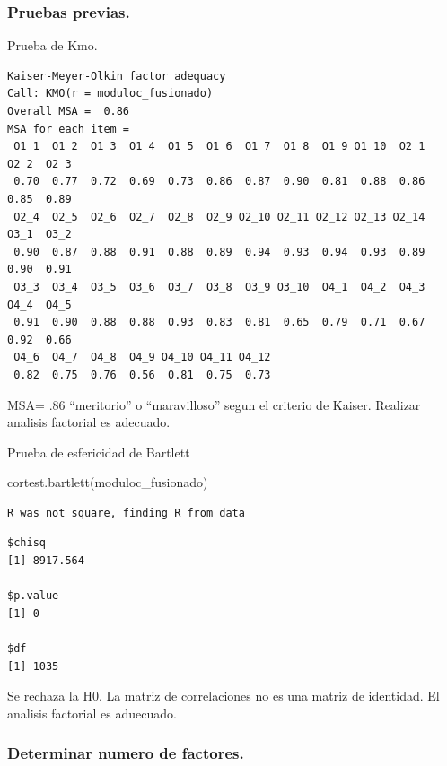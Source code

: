 \documentclass[
  letterpaper,
  DIV=11,
  numbers=noendperiod]{scrartcl}
\newenvironment{Shaded}{\begin{snugshade}}{\end{snugshade}}
\newcommand{\FunctionTok}[1]{\textcolor[rgb]{0.28,0.35,0.67}{#1}}
\newcommand{\NormalTok}[1]{\textcolor[rgb]{0.00,0.23,0.31}{#1}}
\begin{document}
\subsubsection{Pruebas previas.}\label{pruebas-previas.}

Prueba de Kmo.

\begin{verbatim}
Kaiser-Meyer-Olkin factor adequacy
Call: KMO(r = moduloc_fusionado)
Overall MSA =  0.86
MSA for each item = 
 O1_1  O1_2  O1_3  O1_4  O1_5  O1_6  O1_7  O1_8  O1_9 O1_10  O2_1  O2_2  O2_3 
 0.70  0.77  0.72  0.69  0.73  0.86  0.87  0.90  0.81  0.88  0.86  0.85  0.89 
 O2_4  O2_5  O2_6  O2_7  O2_8  O2_9 O2_10 O2_11 O2_12 O2_13 O2_14  O3_1  O3_2 
 0.90  0.87  0.88  0.91  0.88  0.89  0.94  0.93  0.94  0.93  0.89  0.90  0.91 
 O3_3  O3_4  O3_5  O3_6  O3_7  O3_8  O3_9 O3_10  O4_1  O4_2  O4_3  O4_4  O4_5 
 0.91  0.90  0.88  0.88  0.93  0.83  0.81  0.65  0.79  0.71  0.67  0.92  0.66 
 O4_6  O4_7  O4_8  O4_9 O4_10 O4_11 O4_12 
 0.82  0.75  0.76  0.56  0.81  0.75  0.73 
\end{verbatim}

MSA= .86 ``meritorio'' o ``maravilloso'' segun el criterio de Kaiser.
Realizar analisis factorial es adecuado.

Prueba de esfericidad de Bartlett

\begin{Shaded}
\begin{Highlighting}[]
\FunctionTok{cortest.bartlett}\NormalTok{(moduloc\_fusionado)}
\end{Highlighting}
\end{Shaded}

\begin{verbatim}
R was not square, finding R from data
\end{verbatim}

\begin{verbatim}
$chisq
[1] 8917.564

$p.value
[1] 0

$df
[1] 1035
\end{verbatim}

Se rechaza la H0. La matriz de correlaciones no es una matriz de
identidad. El analisis factorial es aduecuado.

\subsubsection{Determinar numero de
factores.}\label{determinar-numero-de-factores.}
\end{document}
